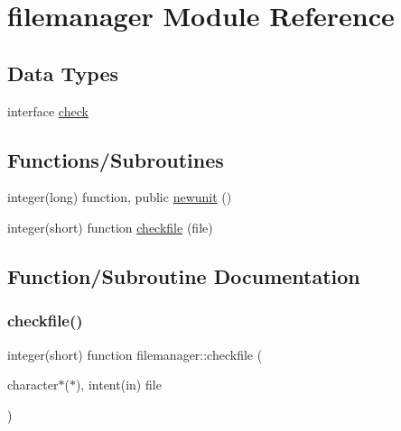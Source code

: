 \hypertarget{namespacefilemanager}{}\section{filemanager Module Reference}
\label{namespacefilemanager}
\subsection*{Data Types}
\begin{DoxyCompactItemize}
\item 
interface \hyperlink{interfacefilemanager_1_1check}{check}
\end{DoxyCompactItemize}
\subsection*{Functions/\+Subroutines}
\begin{DoxyCompactItemize}
\item 
integer(long) function, public \hyperlink{namespacefilemanager_aa389048ef7c9eb9afdac7ce1dcc691b2}{newunit} ()
\item 
integer(short) function \hyperlink{namespacefilemanager_a0c7a869ddf6cd3ea9fad5b6de4069cf3}{checkfile} (file)
\end{DoxyCompactItemize}


\subsection{Function/\+Subroutine Documentation}
\mbox{\label{namespacefilemanager_a0c7a869ddf6cd3ea9fad5b6de4069cf3}} 
\subsubsection{\texorpdfstring{checkfile()}{checkfile()}}
{\footnotesize\ttfamily integer(short) function filemanager\+::checkfile (\begin{DoxyParamCaption}\item[{character$\ast$($\ast$), intent(in)}]{file }\end{DoxyParamCaption})\hspace{0.3cm}{\ttfamily [private]}}

\mbox{\label{namespacefilemanager_aa389048ef7c9eb9afdac7ce1dcc691b2}} 
